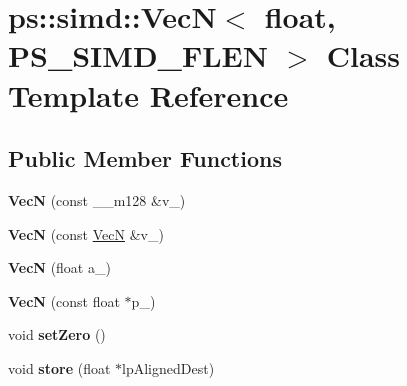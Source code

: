 \hypertarget{classps_1_1simd_1_1VecN_3_01float_00_01PS__SIMD__FLEN_01_4}{}\section{ps\+:\+:simd\+:\+:Vec\+N$<$ float, P\+S\+\_\+\+S\+I\+M\+D\+\_\+\+F\+L\+E\+N $>$ Class Template Reference}
\label{classps_1_1simd_1_1VecN_3_01float_00_01PS__SIMD__FLEN_01_4}
\subsection*{Public Member Functions}
\begin{DoxyCompactItemize}
\item 
\hypertarget{classps_1_1simd_1_1VecN_3_01float_00_01PS__SIMD__FLEN_01_4_aa2e0e933673770cb392f842364fbf037}{}{\bfseries Vec\+N} (const \+\_\+\+\_\+m128 \&v\+\_\+)\label{classps_1_1simd_1_1VecN_3_01float_00_01PS__SIMD__FLEN_01_4_aa2e0e933673770cb392f842364fbf037}

\item 
\hypertarget{classps_1_1simd_1_1VecN_3_01float_00_01PS__SIMD__FLEN_01_4_a0f9e6a495f32aab3dae414d8406c2a16}{}{\bfseries Vec\+N} (const \hyperlink{classps_1_1simd_1_1VecN}{Vec\+N} \&v\+\_\+)\label{classps_1_1simd_1_1VecN_3_01float_00_01PS__SIMD__FLEN_01_4_a0f9e6a495f32aab3dae414d8406c2a16}

\item 
\hypertarget{classps_1_1simd_1_1VecN_3_01float_00_01PS__SIMD__FLEN_01_4_adbc3cb7cb07a5c39cf750446e5fcccf4}{}{\bfseries Vec\+N} (float a\+\_\+)\label{classps_1_1simd_1_1VecN_3_01float_00_01PS__SIMD__FLEN_01_4_adbc3cb7cb07a5c39cf750446e5fcccf4}

\item 
\hypertarget{classps_1_1simd_1_1VecN_3_01float_00_01PS__SIMD__FLEN_01_4_a9f5eb2c185550c0c6fe784f396699030}{}{\bfseries Vec\+N} (const float $\ast$p\+\_\+)\label{classps_1_1simd_1_1VecN_3_01float_00_01PS__SIMD__FLEN_01_4_a9f5eb2c185550c0c6fe784f396699030}

\item 
\hypertarget{classps_1_1simd_1_1VecN_3_01float_00_01PS__SIMD__FLEN_01_4_a1abf2da18c8b1dba5c9d891288597971}{}void {\bfseries set\+Zero} ()\label{classps_1_1simd_1_1VecN_3_01float_00_01PS__SIMD__FLEN_01_4_a1abf2da18c8b1dba5c9d891288597971}

\item 
\hypertarget{classps_1_1simd_1_1VecN_3_01float_00_01PS__SIMD__FLEN_01_4_aa772860ad9398c34f48b783e80470434}{}void {\bfseries store} (float $\ast$lp\+Aligned\+Dest)\label{classps_1_1simd_1_1VecN_3_01float_00_01PS__SIMD__FLEN_01_4_aa772860ad9398c34f48b783e80470434}


\end{DoxyCompactItemize}
